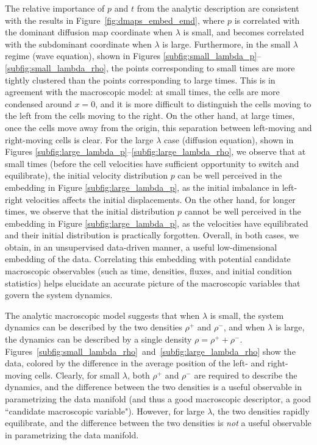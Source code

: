 \documentclass[3p]{elsarticle}
\begin{document}
The relative importance of $p$ and $t$ from the analytic description are consistent with the results 
in Figure~\ref{fig:dmaps_embed_emd}, where $p$ is correlated with the dominant diffusion map coordinate 
when $\lambda$ is small, and becomes correlated with the subdominant coordinate when $\lambda$ is large.
%
Furthermore, in the small $\lambda$ regime (wave equation), shown in 
Figures \ref{subfig:small_lambda_p}--\ref{subfig:small_lambda_rho}, the points corresponding to 
small times are more tightly clustered than the points corresponding to large times.
%
This is in agreement with the macroscopic model: at small times, the cells are more 
condensed around $x=0$, and it is more difficult to distinguish the cells moving to the left from the cells moving to the right.
%
On the other hand, at large times, once the cells move away from the origin, this separation between left-moving and
right-moving cells is clear.
%
For the large $\lambda$ case (diffusion equation), shown in Figures \ref{subfig:large_lambda_p}--\ref{subfig:large_lambda_rho}, 
we observe that at small times (before the cell velocities have sufficient opportunity to switch and equilibrate), the initial velocity distribution $p$ can be well perceived in the
embedding in Figure \ref{subfig:large_lambda_p}, as the initial imbalance in left-right velocities affects
the initial displacements.
%
On the other hand, for longer times, we observe that the initial distribution $p$ cannot be well perceived
in the embedding in Figure \ref{subfig:large_lambda_p}, 
as the velocities have equilibrated and their initial distribution is practically forgotten.
%
Overall, in both cases, we obtain, in an unsupervised data-driven manner, a useful low-dimensional embedding of the data.
%
Correlating this embedding with potential candidate macroscopic observables (such as time, densities, fluxes, and initial condition statistics) helps elucidate
an accurate picture of the macroscopic variables that govern the system dynamics.

The analytic macroscopic model suggests that when $\lambda$ is small, the system dynamics 
can be described by the two densities $\rho^+$ and $\rho^-$, 
and when $\lambda$ is large, the dynamics can be described by a single density $\rho = \rho^+ + \rho^-$.
%
Figures~\ref{subfig:small_lambda_rho}~and~\ref{subfig:large_lambda_rho} show the data, 
colored by the difference in the average position of the left- and right-moving cells.
%
Clearly, for small $\lambda$, both $\rho^+$ and $\rho^-$ are required to describe the dynamics, and
the difference between the two densities is a useful observable in parametrizing the data manifold
(and thus a good macroscopic descriptor, a good ``candidate macroscopic variable").
%
However, for large $\lambda$, the two densities rapidly equilibrate, and the difference between the two 
densities is {\em not} a useful observable in parametrizing the data manifold. 
\end{document}
